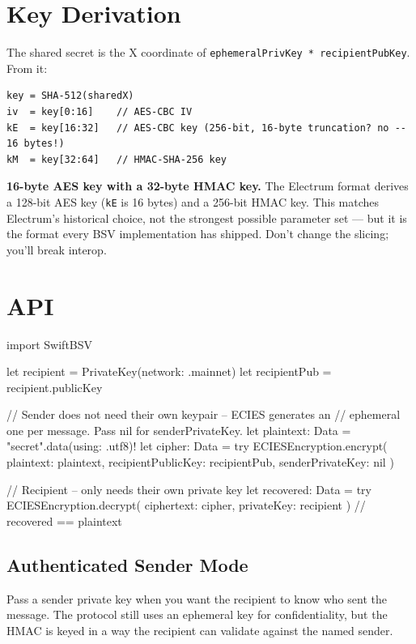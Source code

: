 \documentclass[a4paper, 11pt, openany]{book}
\begin{document}
\section{Key Derivation}

The shared secret is the X coordinate of \texttt{ephemeralPrivKey * recipientPubKey}. From it:

\begin{verbatim}
key = SHA-512(sharedX)
iv  = key[0:16]    // AES-CBC IV
kE  = key[16:32]   // AES-CBC key (256-bit, 16-byte truncation? no -- 16 bytes!)
kM  = key[32:64]   // HMAC-SHA-256 key
\end{verbatim}

\begin{notebox}
\textbf{16-byte AES key with a 32-byte HMAC key.} The Electrum format derives a 128-bit AES key (\texttt{kE} is 16 bytes) and a 256-bit HMAC key. This matches Electrum's historical choice, not the strongest possible parameter set --- but it is the format every BSV implementation has shipped. Don't change the slicing; you'll break interop.
\end{notebox}

\section{API}

\begin{forthbox}
import SwiftBSV

let recipient = PrivateKey(network: .mainnet)
let recipientPub = recipient.publicKey

// Sender does not need their own keypair -- ECIES generates an
// ephemeral one per message. Pass nil for senderPrivateKey.
let plaintext: Data = "secret".data(using: .utf8)!
let cipher: Data = try ECIESEncryption.encrypt(
    plaintext: plaintext,
    recipientPublicKey: recipientPub,
    senderPrivateKey: nil
)

// Recipient -- only needs their own private key
let recovered: Data = try ECIESEncryption.decrypt(
    ciphertext: cipher,
    privateKey: recipient
)
// recovered == plaintext
\end{forthbox}

\subsection{Authenticated Sender Mode}

Pass a sender private key when you want the recipient to know who sent the message. The protocol still uses an ephemeral key for confidentiality, but the HMAC is keyed in a way the recipient can validate against the named sender.
\end{document}
